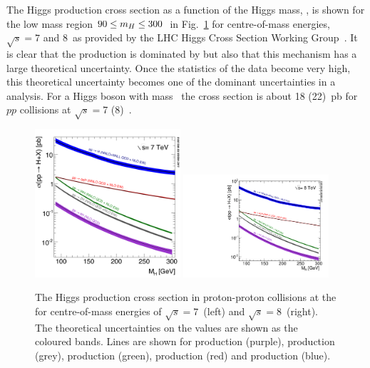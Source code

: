 The \SM Higgs production cross section as a function of the Higgs mass, \mH, is shown for the low mass region $90\leq m_{H}\leq 300$~\GeV in Fig.~\ref{fig:higgs_xs} for centre-of-mass energies, $\sqrt{s}=7$ and 8~\TeV as provided by the LHC Higgs Cross Section Working Group~\cite{LHCHiggsCrossSectionWorkingGroup3}. It is clear that the production is dominated by \ggH but also that this mechanism has a large theoretical uncertainty. Once the statistics of the \LHC data become very high, this theoretical uncertainty becomes one of the dominant uncertainties in a \Hgg analysis. For a \SM Higgs boson with mass ~\GeV the cross section is about 18 (22)~pb for $pp$ collisions at $\sqrt{s}=$7 (8)~\TeV.

\begin{figure}
  \includegraphics[width=0.48\textwidth]{theory/plots/Higgs_XS_7TeV_LM}
  \includegraphics[width=0.48\textwidth]{theory/plots/Higgs_XS_8TeV_LM}
  \caption[\SM Higgs production cross section at the \LHC]{The \SM Higgs production cross section in proton-proton collisions at the \LHC for centre-of-mass energies of $\sqrt{s}=7$~\TeV (left) and $\sqrt{s}=8$~\TeV (right). The theoretical uncertainties on the values are shown as the coloured bands. Lines are shown for \ttH production (purple), \ZH production (grey), \WH production (green), \VBF production (red) and \ggH production (blue).}
  \label{fig:higgs_xs}
\end{figure}

